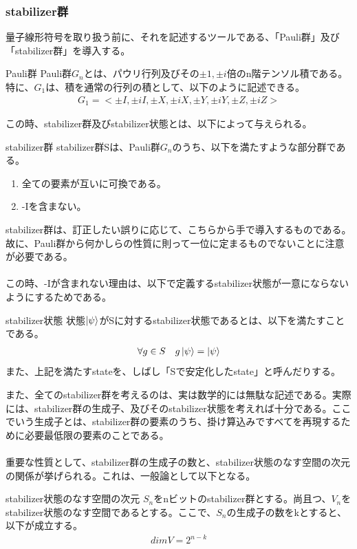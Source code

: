 \documentclass[a4paper,10.5pt]{article}
\numberwithin{equation}{section}
\begin{document}
\subsubsection{stabilizer群}
量子線形符号を取り扱う前に、それを記述するツールである、「Pauli群」及び「stabilizer群」を導入する。
\begin{defbox}{Pauli群}
Pauli群$G_{n}$とは、パウリ行列及びその$\pm1,\pm i$倍のn階テンソル積である。特に、$G_{1}$は、積を通常の行列の積として、以下のように記述できる。
\begin{align*}
    G_{1}=<\pm I,\pm iI, \pm X,\pm iX,\pm Y,\pm iY,\pm Z,\pm iZ>
\end{align*}
\end{defbox}
この時、stabilizer群及びstabilizer状態とは、以下によって与えられる。
\begin{defbox}{stabilizer群}
stabilizer群Sは、Pauli群$G_{n}$のうち、以下を満たすような部分群である。
\begin{enumerate}
    \item 全ての要素が互いに可換である。
    \item -Iを含まない。
\end{enumerate}
\end{defbox}
stabilizer群は、訂正したい誤りに応じて、こちらから手で導入するものである。故に、Pauli群から何かしらの性質に則って一位に定まるものでないことに注意が必要である。\\
\\
この時、-Iが含まれない理由は、以下で定義するstabilizer状態が一意にならないようにするためである。
\begin{defbox}{stabilizer状態}
    状態$\ket{\psi}$がSに対するstabilizer状態であるとは、以下を満たすことである。
    \begin{align*}
        \forall g\in S\quad g\ket{\psi}=\ket{\psi}
    \end{align*}
    また、上記を満たすstateを、しばし「Sで安定化したstate」と呼んだりする。
\end{defbox}
また、全てのstabilizer群を考えるのは、実は数学的には無駄な記述である。実際には、stabilizer群の生成子、及びそのstabilizer状態を考えれば十分である。ここでいう生成子とは、stabilizer群の要素のうち、掛け算込みですべてを再現するために必要最低限の要素のことである。\\
\\
重要な性質として、stabilizer群の生成子の数と、stabilizer状態のなす空間の次元の関係が挙げられる。これは、一般論として以下となる。
\begin{theorembox}{stabilizer状態のなす空間の次元}
    $S_{n}$をnビットのstabilizer群とする。尚且つ、$V_{n}$をstabilizer状態のなす空間であるとする。ここで、$S_{n}$の生成子の数をkとすると、以下が成立する。
    \begin{align*}
        dimV=2^{n-k}
    \end{align*}
\end{theorembox}
\end{document}
